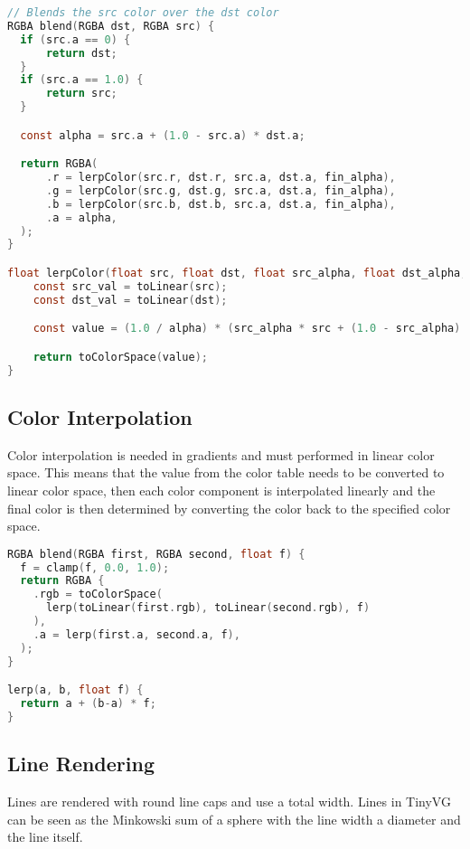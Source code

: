 \documentclass[]{article}
\begin{document}
\begin{lstlisting}[language=c]
// Blends the src color over the dst color
RGBA blend(RGBA dst, RGBA src) {
  if (src.a == 0) {
      return dst;
  }
  if (src.a == 1.0) {
      return src;
  }

  const alpha = src.a + (1.0 - src.a) * dst.a;

  return RGBA(
      .r = lerpColor(src.r, dst.r, src.a, dst.a, fin_alpha),
      .g = lerpColor(src.g, dst.g, src.a, dst.a, fin_alpha),
      .b = lerpColor(src.b, dst.b, src.a, dst.a, fin_alpha),
      .a = alpha,
  );
}

float lerpColor(float src, float dst, float src_alpha, float dst_alpha, float alpha) {
    const src_val = toLinear(src);
    const dst_val = toLinear(dst);

    const value = (1.0 / alpha) * (src_alpha * src + (1.0 - src_alpha) * dst_alpha * dst);

    return toColorSpace(value);
}
\end{lstlisting}

\hypertarget{color-interpolation}{\subsection{Color Interpolation}\label{color-interpolation}}

Color interpolation is needed in gradients and must performed in linear color space. This means that the value from the color table needs to be converted to linear color space, then each color component is interpolated linearly and the final color is then determined by converting the color back to the specified color space.

\begin{lstlisting}[language=c]
RGBA blend(RGBA first, RGBA second, float f) {
  f = clamp(f, 0.0, 1.0);
  return RGBA {
    .rgb = toColorSpace(
      lerp(toLinear(first.rgb), toLinear(second.rgb), f)
    ),
    .a = lerp(first.a, second.a, f),
  );
}

lerp(a, b, float f) {
  return a + (b-a) * f;
}
\end{lstlisting}

\hypertarget{line-rendering}{\subsection{Line Rendering}\label{line-rendering}}

Lines are rendered with round line caps and use a total width. Lines in TinyVG can be seen as the Minkowski sum of a sphere with the line width a diameter and the line itself.
\end{document}
